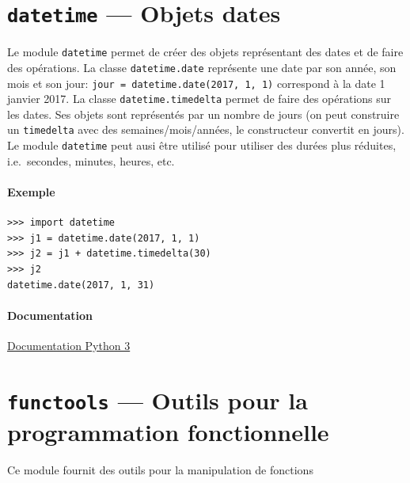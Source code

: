 \documentclass[a4paper, 10pt]{article}
\begin{document}



\section[{\footnotesize\texttt{datetime}} --- Objets dates]{{\normalfont\bfseries\large\texttt{datetime}} --- Objets dates}\label{datetime}

Le module \texttt{datetime} permet de créer des objets représentant des dates et de faire des opérations. La classe \texttt{datetime.date} représente une date par son année, son mois et son jour: \texttt{jour = datetime.date(2017, 1, 1)} correspond à la date 1\ier{} janvier 2017.
La classe \texttt{datetime.timedelta} permet de faire des opérations sur les dates. Ses objets sont représentés par un nombre de jours (on peut construire un \texttt{timedelta} avec des semaines/mois/années, le constructeur convertit en jours).
Le module \texttt{datetime} peut ausi être utilisé pour utiliser des durées plus réduites, i.e.\ secondes, minutes, heures, etc.

\paragraph{Exemple}
\begin{verbatim}
>>> import datetime
>>> j1 = datetime.date(2017, 1, 1)
>>> j2 = j1 + datetime.timedelta(30)
>>> j2
datetime.date(2017, 1, 31)
\end{verbatim}


\paragraph*{Documentation} \href{https://docs.python.org/fr/3/library/datetime.html}{Documentation Python 3}

\section[{\footnotesize\texttt{functools}} --- Outils pour la programmation fonctionnelle]{{\normalfont\bfseries\large\texttt{functools}} --- Outils pour la programmation fonctionnelle}
Ce  module fournit des outils pour la manipulation de fonctions
\end{document}
